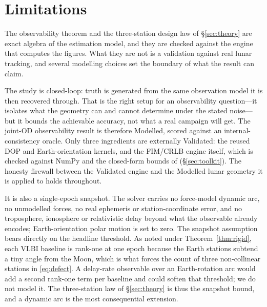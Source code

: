 \section{Limitations}

The observability theorem and the three-station design law of \S\ref{sec:theory}
are exact algebra of the estimation model, and they are checked against the
engine that computes the figures. What they are not is a validation against real
lunar tracking, and several modelling choices set the boundary of what the result
can claim.

The study is closed-loop: truth is generated from the same observation model it is
then recovered through. That is the right setup for an observability question---it
isolates what the geometry can and cannot determine under the stated noise---but it
bounds the achievable accuracy, not what a real campaign will get. The joint-OD
observability result is therefore Modelled, scored against an internal-consistency
oracle. Only three ingredients are externally Validated: the reused DOP and
Earth-orientation kernels, and the FIM/CRLB engine itself, which is checked against
NumPy and the closed-form bounds of \citet{kay1993} (\S\ref{sec:toolkit}). The
honesty firewall between the Validated engine and the Modelled lunar geometry it is
applied to holds throughout.

It is also a single-epoch snapshot. The solver carries no force-model dynamic arc,
no unmodelled forces, no real ephemeris or station-coordinate error, and no
troposphere, ionosphere or relativistic delay beyond what the observable already
encodes; Earth-orientation polar motion is set to zero. The snapshot assumption
bears directly on the headline threshold. As noted under Theorem~\ref{thm:rigid},
each VLBI baseline is rank-one at one epoch because the Earth stations subtend a
tiny angle from the Moon, which is what forces the count of three non-collinear
stations in \eqref{eq:defect}. A delay-rate observable over an Earth-rotation arc
would add a second rank-one term per baseline and could soften that threshold; we
do not model it. The three-station law of \S\ref{sec:theory} is thus the snapshot
bound, and a dynamic arc is the most consequential extension.

